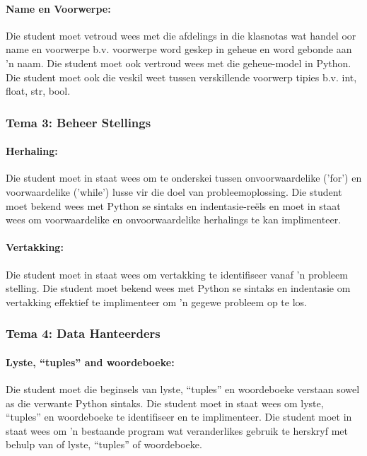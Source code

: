             \paragraph{Name en Voorwerpe:}
		 Die student moet vetroud wees met die afdelings in die klasnotas wat handel oor
		 name en voorwerpe b.v. voorwerpe word geskep in geheue en word
		 gebonde aan 'n naam.  Die student moet ook vertroud wees met die 
		 geheue-model in Python.  Die student moet ook die veskil weet
		 tussen verskillende voorwerp tipies b.v. int, float, str, bool.

                
        \subsubsection{Tema 3: Beheer Stellings}
            \paragraph{Herhaling:}
                Die student moet in staat wees om te onderskei tussen onvoorwaardelike
                ('for') en voorwaardelike ('while') lusse vir die doel van probleemoplossing. 
                Die student moet bekend wees met Python se sintaks en indentasie-re\"{e}ls en moet in staat wees om 
                voorwaardelike en onvoorwaardelike herhalings te kan implimenteer.
                
            \paragraph{Vertakking:}
		Die student moet in staat wees om vertakking te identifiseer vanaf
		'n probleem stelling. Die student moet bekend wees met Python se sintaks
		en indentasie om vertakking effektief te implimenteer om 'n gegewe
		probleem op te los.
            
        \subsubsection{Tema 4: Data Hanteerders}
            \paragraph{Lyste, ``tuples'' and woordeboeke:}
		 Die student moet die beginsels van lyste, ``tuples'' en woordeboeke
		 verstaan sowel as die verwante Python sintaks.  Die student
		 moet in staat wees om lyste, ``tuples'' en woordeboeke te identifiseer
		 en te implimenteer.  Die student moet in staat wees om 'n 
		 bestaande program wat veranderlikes gebruik te herskryf met
		 behulp van of lyste, ``tuples'' of woordeboeke.
                
